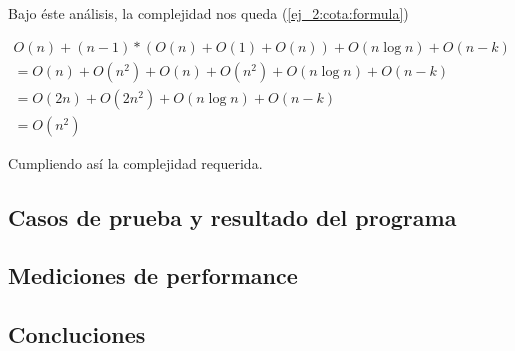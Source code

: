 Bajo \'este an\'alisis, la complejidad nos queda (\ref{ej_2:cota:formula})

\begin{equation}
\label{ej_2:cota:formula}
\begin{split}
O(n) + (n-1)*(O(n) + O(1) + O(n)) + O(n \log n) + O(n - k) \\
=
O(n) + O(n^2) + O(n) + O(n^2) + O(n \log n) + O(n - k) \\
=
O(2n) + O(2n^2) + O(n \log n) + O(n - k) \\
= O(n^2)
\end{split}
\end{equation}

Cumpliendo as\'i la complejidad requerida.

\subsection{Casos de prueba y resultado del programa} \label{ej_2:casos}

\subsection{Mediciones de performance} \label{ej_2:performance}

\subsection{Concluciones} \label{ej_2:concluciones}

